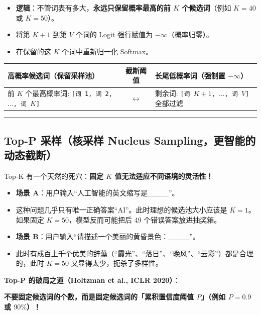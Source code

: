 \begin{itemize}
  \item \textbf{逻辑}：不管词表有多大，\textbf{永远只保留概率最高的前 $K$ 个候选词}（例如 $K=40$ 或 $K=50$）。
  \item 将第 $K+1$ 到第 $V$ 个词的 Logit 强行赋值为 $-\infty$（概率归零）。
  \item 在保留的这 $K$ 个词中重新归一化 Softmax。
\end{itemize}

\begin{center}
\small
\begin{tabularx}{\textwidth}{X c X}
\toprule
\textbf{高概率候选词（保留采样池）} & \textbf{截断阈值} & \textbf{长尾低概率词（强制置 $-\infty$）} \\
\midrule
前 $K$ 个最高概率词: \texttt{[词 1, 词 2, $\dots$, 词 $K$]} & $\longleftrightarrow$ & 剩余词: \texttt{[词 $K+1$, $\dots$, 词 $V$]} 全部过滤 \\
\bottomrule
\end{tabularx}
\end{center}

\vspace{0.8em}\hrule\vspace{0.8em}

\subsection{Top-P 采样（核采样 Nucleus Sampling，更智能的动态截断）}

Top-K 有一个天然的死穴：\textbf{固定 $K$ 值无法适应不同语境的灵活性！}
\begin{itemize}
  \item \textbf{场景 A}：用户输入“人工智能的英文缩写是\_\_\_\_”。
  \item 这种问题几乎只有唯一正确答案“AI”。此时理想的候选池大小应该是 $K=1$。如果固定 $K=50$，模型反而可能把后 49 个错误答案放进抽奖箱。
  \item \textbf{场景 B}：用户输入“请描述一个美丽的黄昏景色：\_\_\_\_”。
  \item 此时有成百上千个优美的辞藻（“霞光”、“落日”、“晚风”、“云彩”）都是合理的，此时 $K=50$ 又显得太少，扼杀了多样性。
\end{itemize}

\textbf{Top-P 的破局之道（Holtzman et al., ICLR 2020）}：
\begin{noteBox}[核心导读与背景]
\textbf{不要固定候选词的个数，而是固定候选词的「累积置信度阈值 $P$」（例如 $P = 0.9$ 或 $90\%$）！}
\end{noteBox}

